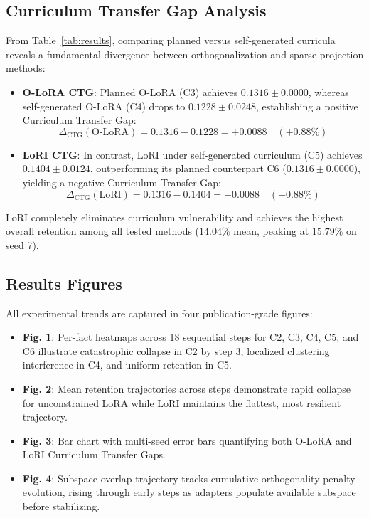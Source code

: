 \documentclass[10pt,journal,compsoc]{IEEEtran}
\begin{document}
\subsection{Curriculum Transfer Gap Analysis}
From Table~\ref{tab:results}, comparing planned versus self-generated curricula reveals a fundamental divergence between orthogonalization and sparse projection methods:
\begin{itemize}
    \item \textbf{O-LoRA CTG}: Planned O-LoRA (C3) achieves $0.1316 \pm 0.0000$, whereas self-generated O-LoRA (C4) drops to $0.1228 \pm 0.0248$, establishing a positive Curriculum Transfer Gap:
    \begin{equation}
    \Delta_{\text{CTG}}(\text{O-LoRA}) = 0.1316 - 0.1228 = +0.0088 \quad (+0.88\%)
    \end{equation}
    \item \textbf{LoRI CTG}: In contrast, LoRI under self-generated curriculum (C5) achieves $0.1404 \pm 0.0124$, outperforming its planned counterpart C6 ($0.1316 \pm 0.0000$), yielding a negative Curriculum Transfer Gap:
    \begin{equation}
    \Delta_{\text{CTG}}(\text{LoRI}) = 0.1316 - 0.1404 = -0.0088 \quad (-0.88\%)
    \end{equation}
\end{itemize}
LoRI completely eliminates curriculum vulnerability and achieves the highest overall retention among all tested methods ($14.04\%$ mean, peaking at $15.79\%$ on seed 7).

\subsection{Results Figures}
All experimental trends are captured in four publication-grade figures:
\begin{itemize}
    \item \textbf{Fig. 1}: Per-fact heatmaps across 18 sequential steps for C2, C3, C4, C5, and C6 illustrate catastrophic collapse in C2 by step 3, localized clustering interference in C4, and uniform retention in C5.
    \item \textbf{Fig. 2}: Mean retention trajectories across steps demonstrate rapid collapse for unconstrained LoRA while LoRI maintains the flattest, most resilient trajectory.
    \item \textbf{Fig. 3}: Bar chart with multi-seed error bars quantifying both O-LoRA and LoRI Curriculum Transfer Gaps.
    \item \textbf{Fig. 4}: Subspace overlap trajectory tracks cumulative orthogonality penalty evolution, rising through early steps as adapters populate available subspace before stabilizing.
\end{itemize}
\end{document}
